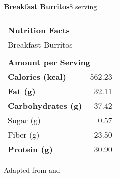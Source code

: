 \documentclass[../recipe-collections/cooking.tex]{subfiles}
\begin{document}
\begin{recipe}{\textbf{Breakfast Burritos}}{8 serving}{}
  \bigskip
  \centering
  \begin{tabular}{|lr|}
    \hline
                                        &                                       \\
    \multicolumn{2}{|l|}{\huge{\textbf{\textrm{Nutrition Facts}}}}              \\
    \multicolumn{2}{|l|}{\textrm{Breakfast Burritos}}                               \\ 
                                        &                                       \\
    \multicolumn{2}{|l|}{\footnotesize{\textbf{\textrm{Amount per Serving}}}}   \\ \hline
    \textbf{\textrm{Calories (kcal)}}   & \textrm{562.23}                          \\ \hline
    \textbf{\textrm{Fat (g)}}           & \textrm{32.11}                           \\ \hline
    \textbf{\textrm{Carbohydrates (g)}} & \textrm{37.42}                            \\ \hline
    \hspace{2mm} \textrm{Sugar (g)}     & \textrm{0.57}                            \\ \hline
    \hspace{2mm} \textrm{Fiber (g)}     & \textrm{23.50}                            \\ \hline
    \textbf{\textrm{Protein (g)}} & \textrm{30.90}                            \\ \hline
  \end{tabular}

  \freeform{}\hrulefill{}

\end{recipe}

Adapted from  
\autocite{Pillsbury_BreakfastBurritos_2021} and
\autocite{MirlandrasKitchen_HashBrowns_2017}
\end{document}
